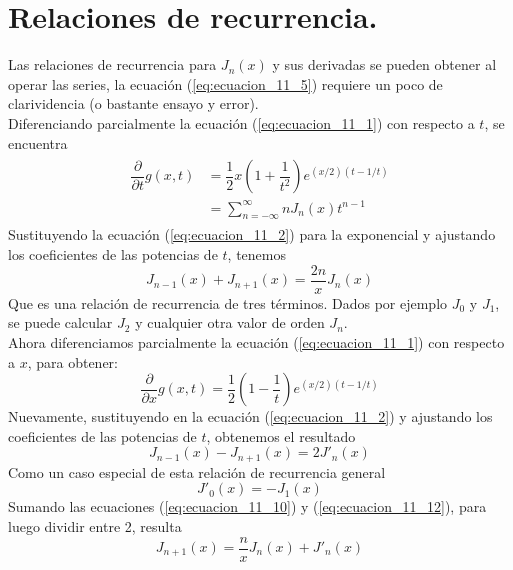 \section{Relaciones de recurrencia.}
Las relaciones de recurrencia para $J_{n}(x)$ y sus derivadas se pueden obtener al operar las series, la ecuación (\ref{eq:ecuacion_11_5}) requiere un poco de clarividencia (o bastante ensayo y error).
\\
Diferenciando parcialmente la ecuación (\ref{eq:ecuacion_11_1}) con respecto a $t$, se encuentra
\begin{eqnarray}
\begin{aligned}
\dfrac{\partial}{\partial t} g(x,t) &= \dfrac{1}{2} x \left( 1 + \dfrac{1}{t^{2}} \right) e^{(x/2)(t-1/t)} \\
&= \sum_{n=-\infty}^{\infty} n J_{n}(x) t^{n-1}
\end{aligned}
\label{eq:ecuacion_11_9}
\end{eqnarray}
Sustituyendo la ecuación (\ref{eq:ecuacion_11_2}) para la exponencial y ajustando los coeficientes de las potencias de $t$, tenemos
\begin{equation}
J_{n-1}(x) + J_{n+1}(x) = \dfrac{2n}{x} J_{n} (x)
\label{eq:ecuacion_11_10}
\end{equation}
Que es una relación de recurrencia de tres términos. Dados por ejemplo $J_{0}$ y $J_{1}$, se puede calcular $J_{2}$ y cualquier otra valor de orden $J_{n}$.
\\
Ahora diferenciamos parcialmente la ecuación (\ref{eq:ecuacion_11_1}) con respecto a $x$, para obtener:
\begin{equation}
\dfrac{\partial}{\partial x} g(x,t) = \dfrac{1}{2} \left( 1 - \dfrac{1}{t} \right) e^{(x/2)(t-1/t)}
\label{eq:ecuacion_11_11}
\end{equation}
Nuevamente, sustituyendo en la ecuación (\ref{eq:ecuacion_11_2}) y ajustando los coeficientes de las potencias de $t$, obtenemos el resultado
\begin{equation}
J_{n-1}(x) - J_{n+1}(x) = 2 J'_{n}(x)
\label{eq:ecuacion_11_12}
\end{equation}
Como un caso especial de esta relación de recurrencia general
\begin{equation}
J'_{0}(x) = - J_{1}(x)
\label{eq:ecuacion_11_13}
\end{equation}
Sumando las ecuaciones (\ref{eq:ecuacion_11_10}) y (\ref{eq:ecuacion_11_12}), para luego dividir entre 2, resulta
\begin{equation}
J_{n+1}(x) = \dfrac{n}{x} J_{n}(x) + J'_{n}(x)
\label{eq:ecuacion_11_14}
\end{equation}
